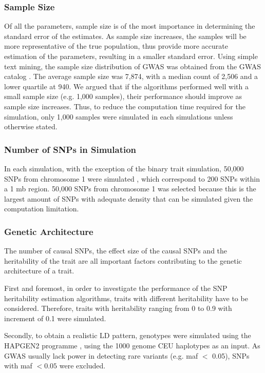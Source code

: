 \documentclass[12pt]{scrbook}
\begin{document}
\subsubsection{Sample Size}
Of all the parameters, sample size is of the most importance in determining the standard error of the estimates. 
As sample size increases, the samples will be more representative of the true population, thus provide more accurate estimation of the parameters, resulting in a smaller standard error.
Using simple text mining, the sample size distribution of \gls{GWAS} was obtained from the \gls{GWAS} catalog \citep{Welter2014}.
The average sample size was 7,874, with a median count of 2,506 and a lower quartile at 940. 
We argued that if the algorithms performed well with a small sample size (e.g. 1,000 samples), their performance should improve as sample size increases.
Thus, to reduce the computation time required for the simulation, only 1,000 samples were simulated in each simulations unless otherwise stated.

\subsubsection{Number of SNPs in Simulation}
In each simulation, with the exception of the binary trait simulation, 50,000 \glspl{SNP} from chromosome 1 were simulated , which correspond to 200 \glspl{SNP} within a 1 \gls{mb} region.
50,000 \glspl{SNP} from chromosome 1 was selected because this is the largest amount of \glspl{SNP} with adequate density that can be simulated given the computation limitation. 

\subsubsection{Genetic Architecture}
The number of causal \glspl{SNP}, the effect size of the causal \glspl{SNP} and the heritability of the trait are all important factors contributing to the genetic architecture of a trait. 
	
First and foremost, in order to investigate the performance of the \gls{SNP} heritability estimation algorithms, traits with different heritability have to be considered.
Therefore, traits with heritability ranging from 0 to 0.9 with increment of 0.1 were simulated. 

Secondly, to obtain a realistic \gls{LD} pattern, genotypes were simulated using the HAPGEN2 programme \citep{Su2011}, using the 1000 genome \gls{CEU} haplotypes as an input.
As \gls{GWAS} usually lack power in detecting rare variants (e.g. \gls{maf} $<$ 0.05), \glspl{SNP} with \gls{maf} $<0.05$ were excluded.
\end{document}

